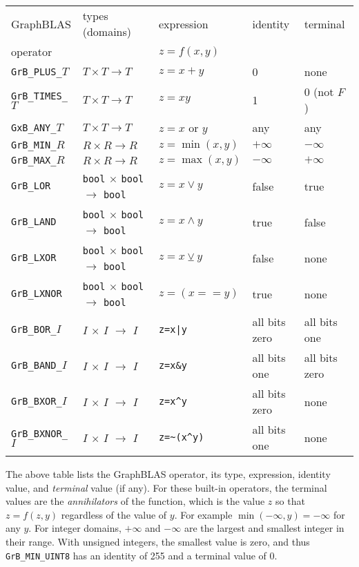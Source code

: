 \documentclass[12pt]{article}
\begin{document}
\vspace{0.2in}
\noindent
{\footnotesize
\begin{tabular}{lllll}
\hline
GraphBLAS             & types (domains)            & expression      & identity  & terminal \\
operator              &                            & $z=f(x,y)$      &           & \\
\hline
\verb'GrB_PLUS_'$T$   & $T \times T \rightarrow T$ & $z = x+y$       & 0         & none \\
\verb'GrB_TIMES_'$T$  & $T \times T \rightarrow T$ & $z = xy$        & 1         & 0 (not $F$) \\
\verb'GxB_ANY_'$T$    & $T \times T \rightarrow T$ & $z = x$ or $y$  & any       & any        \\
\hline
\verb'GrB_MIN_'$R$    & $R \times R \rightarrow R$ & $z = \min(x,y)$ & $+\infty$ & $-\infty$ \\
\verb'GrB_MAX_'$R$    & $R \times R \rightarrow R$ & $z = \max(x,y)$ & $-\infty$ & $+\infty$ \\
\hline
\verb'GrB_LOR'        & \verb'bool' $\times$ \verb'bool' $\rightarrow$ \verb'bool' & $z = x \vee    y $ & false & true  \\
\verb'GrB_LAND'       & \verb'bool' $\times$ \verb'bool' $\rightarrow$ \verb'bool' & $z = x \wedge  y $ & true  & false \\
\verb'GrB_LXOR'       & \verb'bool' $\times$ \verb'bool' $\rightarrow$ \verb'bool' & $z = x \veebar y $ & false & none \\
\verb'GrB_LXNOR'      & \verb'bool' $\times$ \verb'bool' $\rightarrow$ \verb'bool' & $z =(x ==      y)$ & true  & none \\
\hline
\verb'GrB_BOR_'$I$    & $I$ $\times$ $I$ $\rightarrow$ $I$ & \verb'z=x|y'    & all bits zero & all bits one  \\
\verb'GrB_BAND_'$I$   & $I$ $\times$ $I$ $\rightarrow$ $I$ & \verb'z=x&y'    & all bits one  & all bits zero \\
\verb'GrB_BXOR_'$I$   & $I$ $\times$ $I$ $\rightarrow$ $I$ & \verb'z=x^y'    & all bits zero & none \\
\verb'GrB_BXNOR_'$I$  & $I$ $\times$ $I$ $\rightarrow$ $I$ & \verb'z=~(x^y)' & all bits one  & none \\
\hline
\end{tabular}
}
\vspace{0.2in}

The above table lists the GraphBLAS operator, its type, expression, identity
value, and {\em terminal} value (if any).  For these built-in operators, the
terminal values are the {\em annihilators} of the function, which is the value
$z$ so that $z=f(z,y)$ regardless of the value of $y$.  For example
$\min(-\infty,y) = -\infty$ for any $y$.  For integer domains, $+\infty$ and
$-\infty$ are the largest and smallest integer in their range.  With unsigned
integers, the smallest value is zero, and thus \verb'GrB_MIN_UINT8' has an
identity of 255 and a terminal value of 0.
\end{document}
